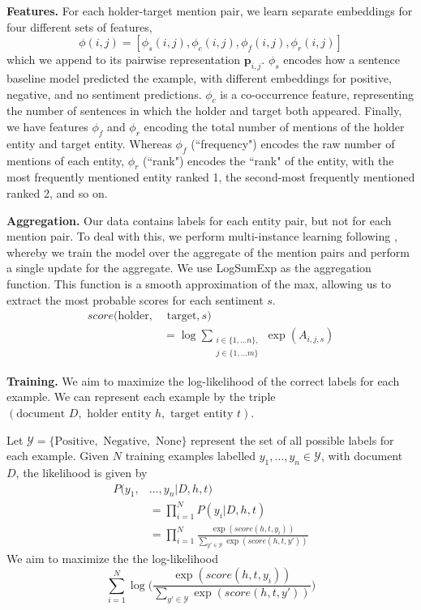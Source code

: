 \documentclass[11pt,a4paper]{article}
\begin{document}
\noindent\textbf{Features.}
For each holder-target mention pair, we learn separate embeddings for four different sets of features,
	$$\phi(i, j) = [\phi_s(i, j),  \phi_c(i, j), \phi_f(i, j), \phi_r(i, j)]$$
which we append to its pairwise representation $\textbf{p}_{i,j}$.
$\phi_s$ encodes how a sentence baseline model predicted the example, with different embeddings for positive, negative, and no sentiment predictions.
$\phi_c$ is a co-occurrence feature, representing the number of sentences in which the holder and target both appeared.
Finally, we have features $\phi_f$ and $\phi_r$ encoding the total number of mentions of the holder entity and target entity.
Whereas $\phi_f$ (``frequency") encodes the raw number of mentions of each entity, $\phi_r$ (``rank") encodes the ``rank" of the entity, with the most frequently mentioned entity ranked 1, the second-most frequently mentioned ranked 2, and so on.

\noindent\textbf{Aggregation.}
Our data contains labels for each entity pair, but not for each mention pair.
To deal with this, we perform multi-instance learning following \citet{Verga:18}, whereby we train the model over the aggregate of the mention pairs and perform a single update for the aggregate.
We use LogSumExp as the aggregation function. This function is a smooth approximation of the max, allowing us to extract the most probable scores for each sentiment $s$.
\begin{align*}
	score(\text{holder}, & \text{ target}, s) \\
	& = \log\sum_{\substack{i\in \{1,\dots n\},\\ j\in \{1,\dots m\}}}\exp{(A_{i, j, s})}
\end{align*}

\noindent\textbf{Training.}
We aim to maximize the log-likelihood of the correct labels for each example.
We can represent each example by the triple $(\text{document }D, \text{ holder entity }h, \text{ target entity }t)$.
\par Let $\mathcal{Y} = \{\text{Positive}, \text{ Negative}, \text{ None}\}$ represent the set of all possible labels for each example.
Given $N$ training examples labelled $y_1,\dots, y_n\in \mathcal{Y}$, with document $D$, the likelihood is given by
\begin{align*}
	P(y_1, & \dots, y_n | D, h, t) \\
	& = \prod_{i=1}^N P(y_i | D, h, t) \\
	& = \prod_{i=1}^N \frac{\exp{(score(h, t, y_i))}}{\sum_{y'\in \mathcal{Y}} \exp{(score(h, t, y'))}}
\end{align*}
We aim to maximize the the log-likelihood
	$$\sum_{i=1}^N \log{\Big(\frac{\exp{(score(h, t, y_i))}}{\sum_{y'\in \mathcal{Y}} \exp{(score(h, t, y'))}}\Big)}$$
\end{document}
